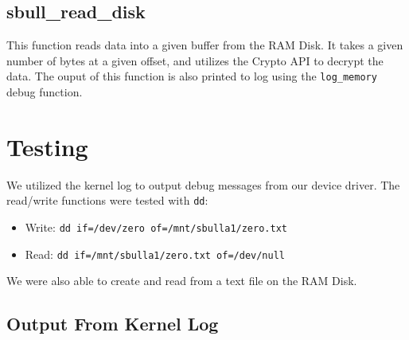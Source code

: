 \documentclass[11pt,letterpaper]{article}
\begin{document}
\subsection*{sbull\_read\_disk}
This function reads data into a given buffer from the RAM Disk. It takes a given number of bytes at a given offset, and utilizes the Crypto API to decrypt the data. The ouput of this function is also printed to log using the \verb|log_memory| debug function.

\newpage

\section*{Testing}

We utilized the kernel log to output debug messages from our device driver.
The read/write functions were tested with \verb|dd|:

\begin{itemize}
	\item Write: \verb|dd if=/dev/zero of=/mnt/sbulla1/zero.txt|
	\item Read: \verb|dd if=/mnt/sbulla1/zero.txt of=/dev/null|
\end{itemize}

We were also able to create and read from a text file on the RAM Disk.


\subsection*{Output From Kernel Log}
\end{document}

